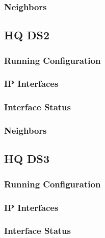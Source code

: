 \subsubsection{Neighbors}


\subsection{HQ DS2}
\subsubsection{Running Configuration}


\subsubsection{IP Interfaces}


\subsubsection{Interface Status}


\subsubsection{Neighbors}


\subsection{HQ DS3}
\subsubsection{Running Configuration}


\subsubsection{IP Interfaces}


\subsubsection{Interface Status}


